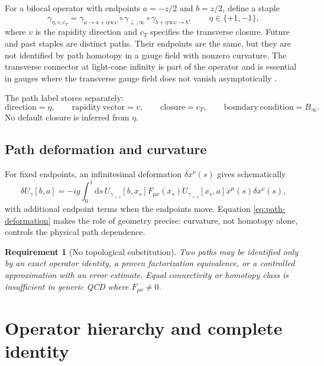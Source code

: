 \documentclass[11pt]{article}
\newtheorem{requirement}[definition]{Requirement}
\newcommand{\dd}{\mathrm{d}}
\begin{document}
For a bilocal operator with endpoints \(a=-z/2\) and \(b=z/2\), define a
staple
\begin{equation}
 \gamma_{\eta,v,c_T}
 =\gamma_{a\to a+\eta\infty v}
 \circ\gamma_{\perp,\infty}
 \circ\gamma_{b+\eta\infty v\to b},
 \qquad \eta\in\{+1,-1\},
\label{eq:staple-path}
\end{equation}
where \(v\) is the rapidity direction and \(c_T\) specifies the transverse
closure.  Future and past staples are distinct paths.  Their endpoints are
the same, but they are not identified by path homotopy in a gauge field with
nonzero curvature.  The transverse connector at light-cone infinity is part
of the operator and is essential in gauges where the transverse gauge field
does not vanish asymptotically \cite{BelitskyJiYuan2003}.

The path label stores separately:
\begin{equation}
 \mathrm{direction}=\eta,
 \qquad
 \mathrm{rapidity\ vector}=v,
 \qquad
 \mathrm{closure}=c_T,
 \qquad
 \mathrm{boundary\ condition}=B_\infty.
\label{eq:staple-fields}
\end{equation}
No default closure is inferred from \(\eta\).

\subsection{Path deformation and curvature}

For fixed endpoints, an infinitesimal deformation \(\delta x^\nu(s)\) gives
schematically
\begin{equation}
 \delta U_\gamma[b,a]
 =-ig\int_0^1\dd s\,
 U_{\gamma_{>s}}[b,x_s]
 F_{\mu\nu}(x_s)
 U_{\gamma_{<s}}[x_s,a]
 \dot x^\mu(s)\delta x^\nu(s),
\label{eq:path-deformation}
\end{equation}
with additional endpoint terms when the endpoints move.  Equation
\eqref{eq:path-deformation} makes the role of geometry precise: curvature,
not homotopy alone, controls the physical path dependence.

\begin{requirement}[No topological substitution]
\label{req:no-topological-substitution}
Two paths may be identified only by an exact operator identity, a proven
factorization equivalence, or a controlled approximation with an error
estimate.  Equal connectivity or homotopy class is insufficient in generic
QCD where \(F_{\mu\nu}\neq0\).
\end{requirement}

\section{Operator hierarchy and complete identity}
\label{sec:operator-hierarchy}
\end{document}
